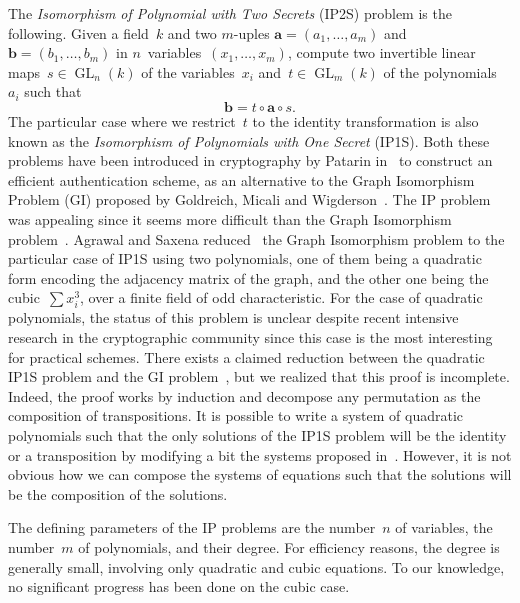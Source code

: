 \documentclass{lms}%
\DeclareMathOperator\GL{GL}
\begin{document}
The \emph{Isomorphism of Polynomial with Two Secrets} (IP2S) problem is
the following. Given a field~$k$ and two $m$-uples $\bm{a} = (a_1, …,
a_m)$ and~$\bm{b} = (b_1, …, b_m)$ in $n$~variables~$(x_1, …, x_m)$, compute
two invertible linear maps~$s ∈ \GL_n(k)$ of the variables~$x_i$
and~$t ∈ \GL_m(k)$ of the polynomials~$a_i$ such that
\begin{equation*}
\bm{b} = t ∘ \bm{a} ∘ s.
\end{equation*}
The particular case where we restrict~$t$ to the identity transformation
is also known as the \emph{Isomorphism of Polynomials with One Secret}
(IP1S). Both these problems have been introduced in cryptography by
Patarin in~\cite{DBLP:conf/eurocrypt/Patarin96} to construct an efficient
authentication scheme, 
as an alternative to the Graph Isomorphism Problem (GI) proposed by Goldreich, Micali and Wigderson~\cite{DBLP:journals/jacm/GoldreichMW91}.
The IP problem was appealing since 
it seems more difficult than the Graph Isomorphism problem~\cite{DBLP:conf/eurocrypt/PatarinGC98}. 
Agrawal and Saxena reduced~\cite{DBLP:conf/stacs/AgrawalS06} the Graph
Isomorphism problem to the particular case of IP1S using two polynomials,
one of them being a quadratic form encoding the adjacency matrix of the
graph, and the other one being the cubic~$\sum x_i^3$, over a finite field of
odd characteristic.
For the case of quadratic polynomials, the status of this problem is unclear despite recent 
intensive research in the cryptographic community since this case is the most interesting 
for practical schemes. There exists a claimed reduction between the quadratic IP1S problem and the GI
problem~\cite{DBLP:conf/eurocrypt/PatarinGC98}, but we realized that this proof is incomplete. 
Indeed, the proof works by induction and decompose any permutation as the composition of 
transpositions. It is possible to write a system of quadratic polynomials such that the only solutions 
of the IP1S problem will be the identity or a transposition by modifying a bit the systems proposed 
in~\cite{DBLP:conf/eurocrypt/PatarinGC98}. However, it is not obvious how we can compose the systems 
of equations such that the solutions will be the composition of the solutions. 

\bigbreak

The defining parameters of the IP problems are the number~$n$ of
variables, the number~$m$ of polynomials, and their degree. For
efficiency reasons, the degree is generally small, involving only
quadratic and cubic equations. To our knowledge, no significant progress
has been done on the cubic case.
\end{document}
